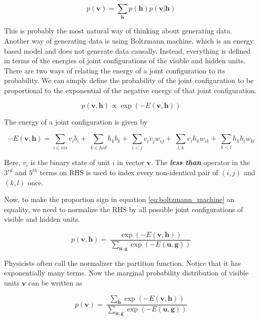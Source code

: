 \documentclass{article}
\begin{document}
\begin{equation}
p(\mathbf{v}) = \sum_{\mathbf{h}} p(\mathbf{h})p(\mathbf{v|h})
\label{eq:causal_model}
\end{equation}   

This is probably the most natural way of thinking about generating data. Another way of generating data is using Boltzmann machine, which is an energy based model and does not generate data causally. Instead, everything is defined in terms of the energies of joint configurations of the visible and hidden units. There are two ways of relating the energy of a joint configuration to its probability. We can simply define the probability of the joint configuration to be proportional to the exponential of the negative energy of that joint configuration.

\begin{equation}
p(\mathbf{v,h}) \propto \exp(-E(\mathbf{v,h}))
\label{eq:boltzmann_machine}
\end{equation}

\noindent The energy of a joint configuration is given by

\begin{equation}
-E(\mathbf{v,h}) = \sum_{i \in vis} v_{i} b_{i} + \
\sum_{k \in hid} h_{k} b_{k} + \
\sum_{i<j} v_{i} v_{j} w_{ij} + \
\sum_{i,k} v_{i} h_{k} w_{ik} + \
\sum_{k<l} h_{k} h_{l} w_{kl}
\label{eq:joint_energy_bm}
\end{equation}

Here, $v_i$ is the binary state of unit $i$ in vector $\mathbf{v}$. The \textit{\textbf{less than}} operator in the $3^{rd}$ and $5^{th}$ terms on RHS is used to index every non-identical pair of $(i,j)$ and $(k,l)$ once. 

Now, to make the proportion sign in equation \ref{eq:boltzmann_machine} an equality, we need to normalize the RHS by all possible joint configurations of visible and hidden units.

\begin{equation}
p(\mathbf{v,h}) = \
\frac{\exp(-E(\mathbf{v,h}))} {\sum_{\mathbf{u,g}}\exp(-E(\mathbf{u,g}))}
\label{eq:boltzmann_machine_equal}
\end{equation} 

Physicists often call the normalizer the partition function. Notice that it has exponentially many terms. Now the marginal probability distribution of visible units $\mathbf{v}$ can be written as

\begin{equation}
p(\mathbf{v}) = \
\frac{\sum_{\mathbf{h}}\exp(-E(\mathbf{v,h}))} {\sum_{\mathbf{u,g}}\exp(-E(\mathbf{u,g}))}
\label{eq:bm_prob_vis}
\end{equation} 
\end{document}
